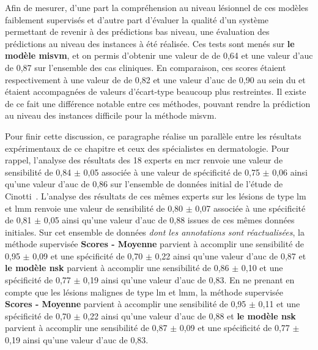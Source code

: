 Afin de mesurer, d'une part la compréhension au niveau lésionnel de ces modèles faiblement supervisés et d'autre part d'évaluer la qualité d'un système permettant de revenir à des prédictions bas niveau, une évaluation des prédictions au niveau des instances à été réalisée. Ces tests sont menés sur \textbf{le modèle \gls{misvm}}, et on permis d'obtenir une valeur de \fscore{} de 0,64 et une valeur d'\gls{auc} de 0,87 sur l'ensemble des cas cliniques. En comparaison, ces scores étaient respectivement à une valeur de \fscore{} de 0,82 et une valeur d'\gls{auc} de 0,90 au sein du  et étaient accompagnées de valeurs d'écart-type beaucoup plus restreintes. Il existe de ce fait une différence notable entre ces méthodes, pouvant rendre la prédiction au niveau des instances difficile pour la méthode \gls{misvm}.\par

Pour finir cette discussion, ce paragraphe réalise un parallèle entre les résultats expérimentaux de ce chapitre et ceux des spécialistes en dermatologie. Pour rappel, l'analyse des résultats des 18 experts en \gls{mcr} renvoie une valeur de sensibilité de 0,84 $\pm$ 0,05 associée à une valeur de spécificité de 0,75 $\pm$ 0,06 ainsi qu'une valeur d'\gls{auc} de 0,86 sur l'ensemble de données initial de l'étude de Cinotti~. L'analyse des résultats de ces mêmes experts sur les lésions de type \gls{lm} et \gls{lmm} renvoie une valeur de sensibilité de 0,80 $\pm$ 0,07 associée à une spécificité de 0,81 $\pm$ 0,05 ainsi qu'une valeur d'\gls{auc} de 0,88 issues de ces mêmes données initiales. Sur cet ensemble de données \textit{dont les annotations sont réactualisées}, la méthode supervisée \textbf{Scores - Moyenne} parvient à accomplir une sensibilité de 0,95 $\pm$ 0,09 et une spécificité de 0,70 $\pm$ 0,22 ainsi qu'une valeur d'\gls{auc} de 0,87 et \textbf{le modèle \gls{nsk}} parvient à accomplir une sensibilité de 0,86 $\pm$ 0,10 et une spécificité de 0,77 $\pm$ 0,19 ainsi qu'une valeur d'\gls{auc} de 0,83. En ne prenant en compte que les lésions malignes de type \gls{lm} et \gls{lmm}, la méthode supervisée \textbf{Scores - Moyenne} parvient à accomplir une sensibilité de 0,95 $\pm$ 0,11 et une spécificité de 0,70 $\pm$ 0,22 ainsi qu'une valeur d'\gls{auc} de 0,88 et \textbf{le modèle \gls{nsk}} parvient à accomplir une sensibilité de 0,87 $\pm$ 0,09 et une spécificité de 0,77 $\pm$ 0,19 ainsi qu'une valeur d'\gls{auc} de 0,83.\par